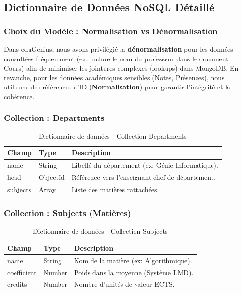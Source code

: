 \subsection{Dictionnaire de Données NoSQL Détaillé}

\subsubsection{Choix du Modèle : Normalisation vs Dénormalisation}
Dans eduGenius, nous avons privilégié la \textbf{dénormalisation} pour les données consultées fréquemment (ex: inclure le nom du professeur dans le document Cours) afin de minimiser les jointures complexes (lookups) dans MongoDB. En revanche, pour les données académiques sensibles (Notes, Présences), nous utilisons des références d'ID (\textbf{Normalisation}) pour garantir l'intégrité et la cohérence.

\subsubsection{Collection : Departments}
\begin{table}[H]
\centering
\begin{tabular}{|l|l|p{8cm}|}
\hline
\textbf{Champ} & \textbf{Type} & \textbf{Description} \\ \hline
name & String & Libellé du département (ex: Génie Informatique). \\ \hline
head & ObjectId & Référence vers l'enseignant chef de département. \\ \hline
subjects & Array & Liste des matières rattachées. \\ \hline
\end{tabular}
\caption{Dictionnaire de données - Collection Departments}
\end{table}

\subsubsection{Collection : Subjects (Matières)}
\begin{table}[H]
\centering
\begin{tabular}{|l|l|p{8cm}|}
\hline
\textbf{Champ} & \textbf{Type} & \textbf{Description} \\ \hline
name & String & Nom de la matière (ex: Algorithmique). \\ \hline
coefficient & Number & Poids dans la moyenne (Système LMD). \\ \hline
credits & Number & Nombre d'unités de valeur ECTS. \\ \hline
\end{tabular}
\caption{Dictionnaire de données - Collection Subjects}
\end{table}

